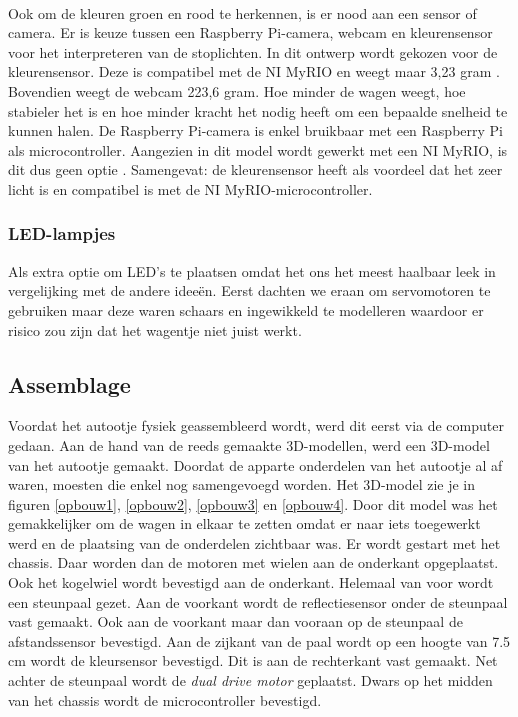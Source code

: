 \documentclass[a4paper,twoside,kulak]{kulakreport} %
\begin{document}
~

Ook om de kleuren groen en rood te herkennen, is er nood aan een sensor of camera. Er is keuze tussen een Raspberry Pi-camera, webcam en kleurensensor voor het interpreteren van de stoplichten. In dit ontwerp wordt gekozen voor de kleurensensor. Deze is compatibel met de NI MyRIO en weegt maar 3,23 gram \cite{Webcam,TCS34725KleurSensorBOB}. Bovendien weegt de webcam 223,6 gram. Hoe minder de wagen weegt, hoe stabieler het is en hoe minder kracht het nodig heeft om een bepaalde snelheid te kunnen halen. De Raspberry Pi-camera is enkel bruikbaar met een Raspberry Pi als microcontroller. Aangezien in dit model wordt gewerkt met een NI MyRIO, is dit dus geen optie \cite{RPi-camera}. Samengevat: de kleurensensor heeft als voordeel dat het zeer licht is en compatibel is met de NI MyRIO-microcontroller. %
\label{Sensoren}


\subsubsection{LED-lampjes}\label{LED-lampjes}
Als extra optie om LED's te plaatsen omdat het ons het meest haalbaar leek in vergelijking met de andere ideeën. Eerst dachten we eraan om servomotoren te gebruiken maar deze waren schaars en ingewikkeld te modelleren waardoor er risico zou zijn dat het wagentje niet juist werkt.


\subsection{Assemblage}
Voordat het autootje fysiek geassembleerd wordt, werd dit eerst via de computer gedaan. Aan de hand van de reeds gemaakte 3D-modellen, werd een 3D-model van het autootje gemaakt. Doordat de apparte onderdelen van het autootje al af waren, moesten die enkel nog samengevoegd worden. Het 3D-model zie je in figuren \ref{opbouw1}, \ref{opbouw2}, \ref{opbouw3} en \ref{opbouw4}.
Door dit model was het gemakkelijker om de wagen in elkaar te zetten omdat er naar iets toegewerkt werd en de plaatsing van de onderdelen zichtbaar was. Er wordt gestart met het chassis. Daar worden dan de motoren met wielen aan de onderkant opgeplaatst. Ook het kogelwiel wordt bevestigd aan de onderkant. Helemaal van voor wordt een steunpaal gezet. Aan de voorkant wordt de reflectiesensor onder de steunpaal vast gemaakt. Ook aan de voorkant maar dan vooraan op de steunpaal de afstandssensor bevestigd. Aan de zijkant van de paal wordt op een hoogte van 7.5 cm wordt de kleursensor bevestigd. Dit is aan de rechterkant vast gemaakt. Net achter de steunpaal wordt de {\it dual drive motor} geplaatst. Dwars op het midden van het chassis wordt de microcontroller bevestigd.
\end{document}
